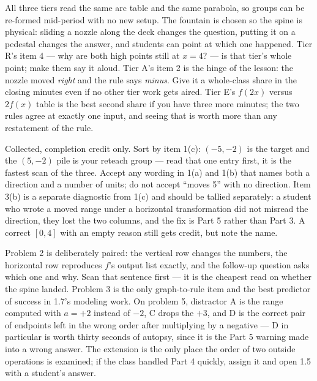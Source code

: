 \documentclass[10pt]{article}
\begin{document}
\begin{teachernote}
All three tiers read the same arc table and the same parabola, so groups can
be re-formed mid-period with no new setup. The fountain is chosen so the
spine is physical: sliding a nozzle along the deck changes the question,
putting it on a pedestal changes the answer, and students can point at which
one happened. Tier R's item 4 --- why are both high points still at $x=4$? ---
is that tier's whole point; make them say it aloud. Tier A's item 2 is the
hinge of the lesson: the nozzle moved \textit{right} and the rule says
\textit{minus}. Give it a whole-class share in the closing minutes even if no
other tier work gets aired. Tier E's $f(2x)$ versus $2f(x)$ table is the best
second share if you have three more minutes; the two rules agree at exactly
one input, and seeing that is worth more than any restatement of the rule.
\end{teachernote}

\begin{teachernote}
Collected, completion credit only. Sort by item 1(c): $(-5,-2)$ is the target
and the $(5,-2)$ pile is your reteach group --- read that one entry first, it
is the fastest scan of the three. Accept any wording in 1(a) and 1(b) that
names both a direction and a number of units; do not accept ``moves 5'' with
no direction. Item 3(b) is a separate diagnostic from 1(c) and should be
tallied separately: a student who wrote a moved range under a horizontal
transformation did not misread the direction, they lost the two columns, and
the fix is Part 5 rather than Part 3. A correct $[0,4]$ with an empty reason
still gets credit, but note the name.
\end{teachernote}

\begin{teachernote}[Homework]
Problem 2 is deliberately paired: the vertical row changes the numbers, the
horizontal row reproduces $f$'s output list exactly, and the follow-up
question asks which one and why. Scan that sentence first --- it is the
cheapest read on whether the spine landed. Problem 3 is the only
graph-to-rule item and the best predictor of success in 1.7's modeling work.
On problem 5, distractor A is the range computed with $a=+2$ instead of $-2$,
C drops the $+3$, and D is the correct pair of endpoints left in the wrong
order after multiplying by a negative --- D in particular is worth thirty
seconds of autopsy, since it is the Part 5 warning made into a wrong answer.
The extension is the only place the order of two outside operations is
examined; if the class handled Part 4 quickly, assign it and open 1.5 with a
student's answer.
\end{teachernote}
\end{document}
